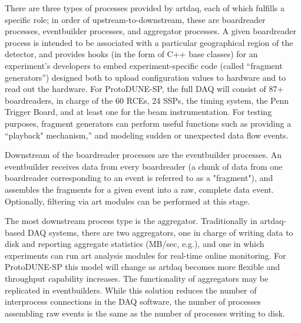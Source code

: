 There are three types of processes provided by artdaq, each of which
fulfills a specific role; in order of upstream-to-downstream, these
are boardreader processes, eventbuilder processes, and aggregator
processes. A given boardreader process is intended to be associated
with a particular geographical region of the detector, and provides
hooks (in the form of C++ base classes) for an experiment's developers
to embed experiment-specific code (called ``fragment generators'')
designed both to upload configuration values to hardware and to read
out the hardware. For ProtoDUNE-SP, the full DAQ will consist of 87+ 
boardreaders, in charge of the 60 RCEs, 24 SSPs, the timing system, 
the Penn Trigger Board, and at least one for the beam instrumentation.
For testing purposes, fragment generators can perform useful
functions such as providing a ``playback" mechanism,'' and modeling sudden or unexpected data flow events.

Downstream of the boardreader processes are the eventbuilder
processes. An eventbuilder receives data from every boardreader (a
chunk of data from one boardreader corresponding to an event is
referred to as a "fragment"), and assembles the fragments for a given
event into a raw, complete data event. Optionally, filtering via art
modules can be performed at this stage.

The most downstream process type is the aggregator. Traditionally in
artdaq-based DAQ systems, there are two aggregators, one in charge of
writing data to disk and reporting aggregate statistics (MB/sec,
e.g.), and one in which experiments can run art analysis modules for
real-time online monitoring. 
%
%
For ProtoDUNE-SP this model will change as
artdaq becomes more flexible and throughput
capability increases. The functionality
of aggregators may be replicated in eventbuilders. While this solution  reduces
the number of interprocess connections in the DAQ software, the number of
processes assembling raw events is the same as the number of processes
writing to disk.


